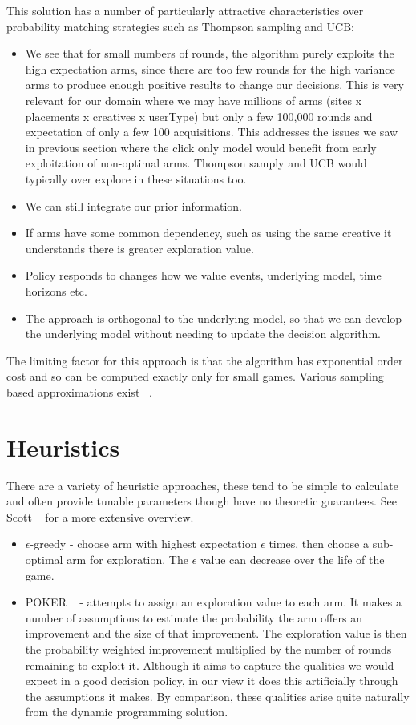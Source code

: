 \documentclass[11pt,a4,singlespacing,titlepagenumber=on]{scrreprt}
\numberwithin{equation}{chapter} %
\theoremstyle{remark}
\begin{document}
This solution has a number of particularly attractive characteristics over probability matching strategies such as Thompson sampling and UCB:
\begin{itemize}
	\item We see that for small numbers of rounds, the algorithm purely exploits the high expectation arms, since there are too few rounds for the high variance arms to produce enough positive results to change our decisions. This is very relevant for our domain where we may have millions of arms (sites x placements x creatives x userType) but only a few 100,000 rounds and expectation of only a few 100 acquisitions. This addresses the issues we saw in previous section where the click only model would benefit from early exploitation of non-optimal arms. Thompson samply and UCB would typically over explore in these situations too.
	\item We can still integrate our prior information.
	\item If arms have some common dependency, such as using the same creative it understands there is greater exploration value.
	\item Policy responds to changes how we value events, underlying model, time horizons etc.
	\item The approach is orthogonal to the underlying model, so that we can develop the underlying model without needing to update the decision algorithm.
\end{itemize}

The limiting factor for this approach is that the algorithm has exponential order cost and so can be computed exactly only for small games. Various sampling based approximations exist ~\cite{guez2012efficient}.

\section{ Heuristics } \label{sec:heuristics}

There are a variety of heuristic approaches, these tend to be simple to calculate and often provide tunable parameters though have no theoretic guarantees. See Scott ~\cite{scott2010modern} for a more extensive overview.

\begin{itemize}
	\item $\epsilon$-greedy - choose arm with highest expectation $\epsilon$ times, then choose a sub-optimal arm for exploration. The $\epsilon$ value can decrease over the life of the game.
	\item POKER ~\cite{vermorel2005multi} - attempts to assign an exploration value to each arm. It makes a number of assumptions to estimate the probability the arm offers an improvement and the size of that improvement. The exploration value is then the probability weighted improvement multiplied by the number of rounds remaining to exploit it. Although it aims to capture the qualities we would expect in a good decision policy, in our view it does this artificially through the assumptions it makes. By comparison, these qualities arise quite naturally from the dynamic programming solution.
\end{itemize}
\end{document}
